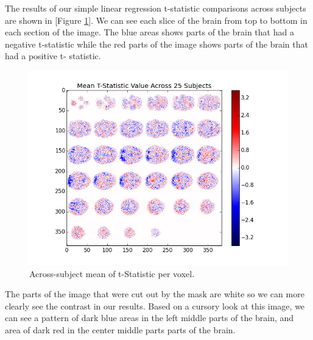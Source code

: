 \par \indent The results of our simple linear regression t-statistic 
comparisons across subjects are shown in [Figure \ref{fig:mask}]. We can see 
each slice of the brain from top to bottom in each section of the image. The 
blue areas shows parts of the brain that had a negative t-statistic while the 
red parts of the image shows parts of the brain that had a positive t-
statistic.

\begin{figure}[ht]
\centering
\includegraphics[scale=0.5]{images/hypothesis_testing}  
\caption{Across-subject mean of t-Statistic per voxel.}
\label{fig:mask}
\end{figure}

\par The parts of the image that were cut out by the mask are white so we can 
more clearly see the contrast in our results. Based on a cursory look at this 
image, we can see a pattern of dark blue areas in the left middle parts of 
the brain, and area of dark red in the center middle parts parts of the 
brain. 
